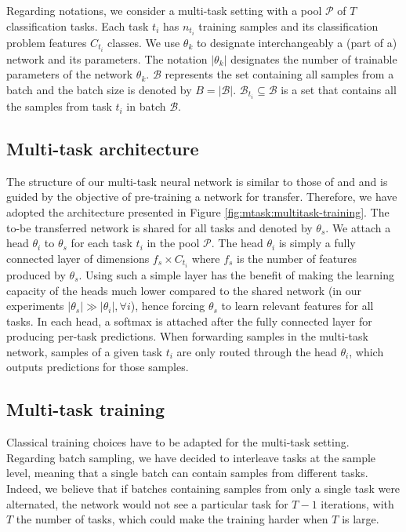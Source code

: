 Regarding notations, we consider a multi-task setting with a pool $\mathcal{P}$ of $T$ classification tasks. Each task $t_i$ has $n_{t_i}$ training samples and its classification problem features $C_{t_i}$ classes. We use $\theta_k$ to designate interchangeably a (part of a) network and its parameters. The notation $|\theta_k|$ designates the number of trainable parameters of the network $\theta_k$. $\mathcal{B}$ represents the set containing all samples from a batch and the batch size is denoted by $B = \left|\mathcal{B}\right|$. $\mathcal{B}_{t_i} \subseteq \mathcal{B}$ is a set that contains all the samples from task $t_i$ in batch $\mathcal{B}$. 

\subsection{Multi-task architecture}
\label{ssec:mtask:multitask-architecture}

The structure of our multi-task neural network is similar to those of \parencite{shang2019and} and \parencite{strezoski2019many} and is guided by the objective of pre-training a network for transfer. Therefore, we have adopted the architecture presented in Figure \ref{fig:mtask:multitask-training}. The to-be transferred network is shared for all tasks and denoted by $\theta_s$. We attach a head $\theta_i$ to $\theta_s$ for each task $t_i$ in the pool $\mathcal{P}$. The head $\theta_i$ is simply a fully connected layer of dimensions $f_s\times C_{t_i}$ where $f_s$ is the number of features produced by $\theta_s$. Using such a simple layer has the benefit of making the learning capacity of the heads much lower compared to the shared network (in our experiments $|\theta_s| \gg |\theta_i|, \forall i$), hence forcing $\theta_s$ to learn relevant features for all tasks. In each head, a softmax is attached after the fully connected layer for producing per-task predictions. When forwarding samples in the multi-task network, samples of a given task $t_i$ are only routed through the head $\theta_i$, which outputs predictions for those samples. 

\subsection{Multi-task training}
\label{ssec:mtask:multitask-training}

Classical training choices have to be adapted for the multi-task setting. Regarding batch sampling, we have decided to interleave tasks at the sample level, meaning that a single batch can contain samples from different tasks. Indeed, we believe that if batches containing samples from only a single task were alternated, the network would not see a particular task for $T-1$ iterations, with $T$ the number of tasks, which could make the training harder when $T$ is large.

